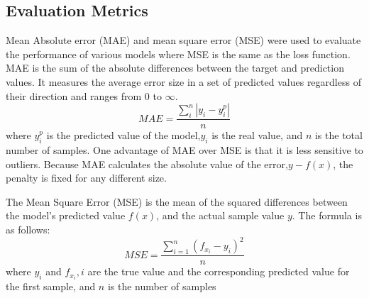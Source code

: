 \documentclass[acmsmall,manuscript, screen, review]{acmart}
\begin{document}
\subsection{Evaluation Metrics}
Mean Absolute error (MAE) and mean square error (MSE) were used to evaluate the performance of various models where MSE is the same as the loss function. MAE is the sum of the absolute differences between the target and prediction values. It measures the average error size in a set of predicted values regardless of their direction and ranges from 0 to \begin{math}\infty\end{math}.
\begin{equation}
  MAE=\frac{\sum_{i}^{n}\left|y_i-y_i^p\right|}{n} \label{mae}
\end{equation}
where \begin{math}
  y_i^p
\end{math} is the predicted value of the model,\begin{math}
  y_i
\end{math} is the real value,
and \begin{math}
  n
\end{math} is the total number of samples.
One advantage of MAE over MSE is that it is less sensitive to outliers. Because MAE calculates the absolute value of the error,\begin{math}
  y-f\left(x\right)
\end{math}, the penalty is fixed for any different size.

The Mean Square Error (MSE) is the mean of the squared differences between the model's predicted value \begin{math}
  f(x)
\end{math}, and the actual sample value \begin{math}
  y
\end{math}. The formula is as follows:
\begin{equation}
  MSE=\frac{\sum_{i=1}^{n}\left(f_{x_i}-y_i\right)^2}{n}
  \label{mse}
\end{equation}
where \begin{math}
  y_i
\end{math} and \begin{math}
  f_{x_i},i
\end{math} are the true value and the corresponding predicted value for the first sample, and \begin{math}
  n
\end{math} is the number of samples
\end{document}
